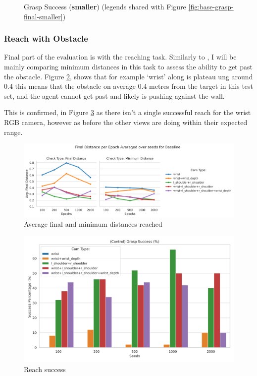 \begin{figure}[H]
  \caption{Grasp Success (\textbf{smaller}) (legends shared with Figure \ref{fig:base-grasp-final-smaller})}\label{fig:base-grasp-success-smaller}
\end{figure}


\subsubsection{Reach with Obstacle}
Final part of the evaluation is with the reaching task. Similarly to , I will be mainly comparing minimum distances in this task to assess the ability to get past the obstacle. Figure \ref{fig:base-reach-dists}, shows that for example `wrist' along is plateau ung around $0.4$ this means that the obstacle on average 0.4 metres from the target in this test set, and the agent cannot get past and likely is pushing against the wall.

This is confirmed, in Figure \ref{fig:base-reach-success} as there isn't a single successful reach for the wrist RGB camera, however as before the other views are doing within their expected range.

\begin{figure}[H]
  \centering
  \includegraphics[width=\linewidth]{assets/evaluation/baseline/base-reach-dists.png}
  \caption{Average final and minimum distances reached}\label{fig:base-reach-dists}
\end{figure}

\begin{figure}[H]
  \centering
  \includegraphics[width=0.7\linewidth]{assets/evaluation/baseline/base-reach-success-cams-epochs.png}
  \caption{Reach success}\label{fig:base-reach-success}
\end{figure}